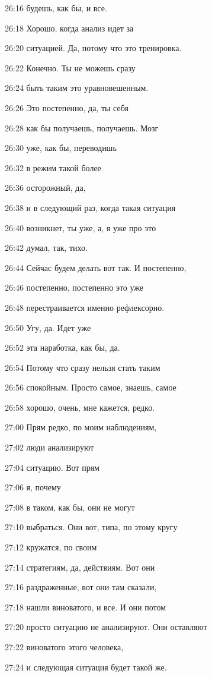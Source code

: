 26:16
будешь, как бы, и все.

26:18
Хорошо, когда анализ идет за

26:20
ситуацией. Да, потому что это тренировка.

26:22
Конечно. Ты не можешь сразу

26:24
быть таким это уравновешенным.

26:26
Это постепенно, да, ты себя

26:28
как бы получаешь, получаешь. Мозг

26:30
уже, как бы, переводишь

26:32
в режим такой более

26:36
осторожный, да,

26:38
и в следующий раз, когда такая ситуация

26:40
возникнет, ты уже, а, я уже про это

26:42
думал, так, тихо.

26:44
Сейчас будем делать вот так. И постепенно,

26:46
постепенно, постепенно это уже

26:48
перестраивается именно рефлексорно.

26:50
Угу, да. Идет уже

26:52
эта наработка, как бы, да.

26:54
Потому что сразу нельзя стать таким

26:56
спокойным. Просто самое, знаешь, самое

26:58
хорошо, очень, мне кажется, редко.

27:00
Прям редко, по моим наблюдениям,

27:02
люди анализируют

27:04
ситуацию. Вот прям

27:06
я, почему

27:08
в таком, как бы, они не могут

27:10
выбраться. Они вот, типа, по этому кругу

27:12
кружатся, по своим

27:14
стратегиям, да, действиям. Вот они

27:16
раздраженные, вот они там сказали,

27:18
нашли виноватого, и все. И они потом

27:20
просто ситуацию не анализируют. Они оставляют

27:22
виноватого этого человека,

27:24
и следующая ситуация будет такой же.

